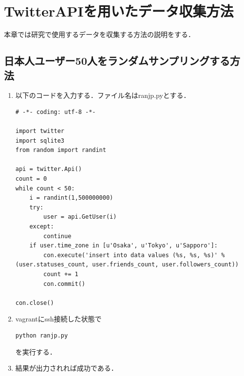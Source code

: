 \section{TwitterAPIを用いたデータ収集方法}

本章では研究で使用するデータを収集する方法の説明をする．

\subsection{日本人ユーザー50人をランダムサンプリングする方法}
\begin{enumerate}
\item 以下のコードを入力する．ファイル名はranjp.pyとする．
\begin{verbatim}
# -*- coding: utf-8 -*-

import twitter
import sqlite3
from random import randint

api = twitter.Api()
count = 0
while count < 50:
    i = randint(1,500000000)
    try:
        user = api.GetUser(i)
    except:
        continue
    if user.time_zone in [u'Osaka', u'Tokyo', u'Sapporo']:
        con.execute('insert into data values (%s, %s, %s)' % (user.statuses_count, user.friends_count, user.followers_count))
        count += 1
        con.commit()

con.close()
\end{verbatim}
\item vagrantにssh接続した状態で
\begin{verbatim}
python ranjp.py
\end{verbatim}
を実行する．
\item 結果が出力されれば成功である．
\end{enumerate}
\newpage

